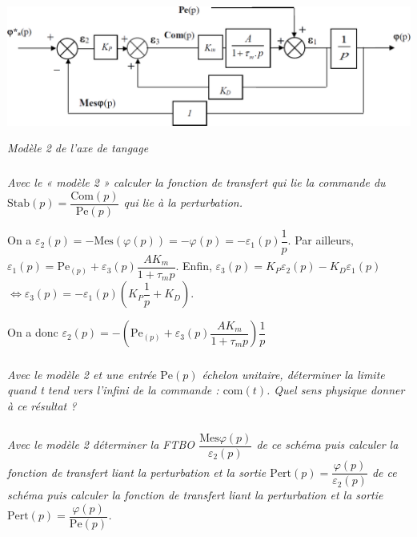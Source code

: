 \documentclass[10pt,fleqn]{article} %
\begin{document}
\begin{multicols}{2}
\begin{center}
\includegraphics[width=\linewidth]{images/fig_03}

\textit{Modèle 2 de l’axe de tangage}
\end{center}


\subparagraph{}
\textit{Avec le « modèle 2 » calculer la fonction de transfert qui lie la commande du $\text{Stab}(p)=\dfrac{\text{Com}(p)}{\text{Pe}(p)}$
qui lie à la perturbation.}%
\ifprof
\begin{corrige}
On a $\varepsilon_2(p) = -\text{Mes}\left( \varphi(p)\right) = -\varphi(p) = -\varepsilon_1(p)\dfrac{1}{p}$. 
Par ailleurs, $\varepsilon_1(p)=\text{Pe}_(p)+\varepsilon_3(p)\dfrac{AK_m}{1+\tau_m p}$. 
Enfin, $\varepsilon_3(p)=K_P\varepsilon_2(p)-K_D \varepsilon_1(p)$ $\Leftrightarrow \varepsilon_3(p)=-\varepsilon_1(p)\left(K_P\dfrac{1}{p} +K_D \right)$. 

On a donc $\varepsilon_2(p) = -\left(\text{Pe}_(p)+\varepsilon_3(p)\dfrac{AK_m}{1+\tau_m p} \right)\dfrac{1}{p}$ 
\end{corrige}
\else
\fi

\subparagraph{}
\textit{Avec le modèle 2 et une entrée $\text{Pe}(p)$ échelon unitaire, déterminer la limite quand t tend vers
l’infini de la commande : $\text{com}(t)$. Quel sens physique donner à ce résultat ?}
\ifprof
\begin{corrige}
\end{corrige}
\else
\fi

\subparagraph{}
\textit{Avec le modèle 2 déterminer la FTBO $\dfrac{\text{Mes}\varphi(p)}{\varepsilon_2(p)}$ de ce schéma puis calculer la fonction de transfert liant la perturbation et la sortie $\text{Pert}(p)=\dfrac{\varphi(p)}{\varepsilon_2(p)}$ de ce schéma puis calculer la fonction de transfert liant la perturbation et la sortie $\text{Pert}(p)=\dfrac{\varphi(p)}{\text{Pe}(p)}$.}
\ifprof
\begin{corrige}
\end{corrige}
\else
\fi




\end{multicols}
\end{document}
